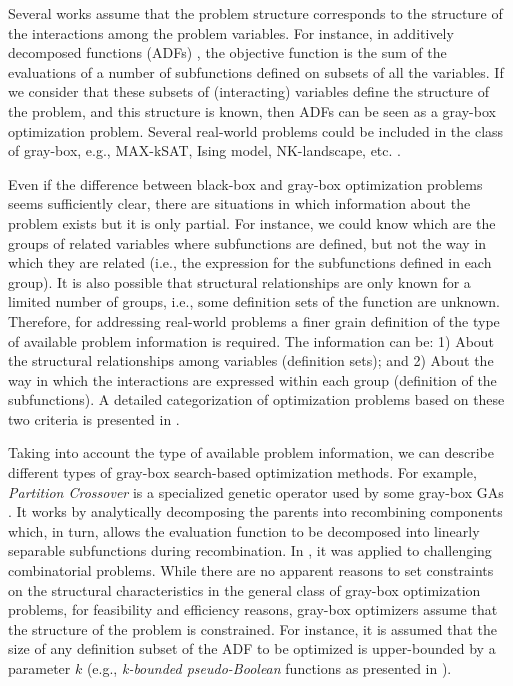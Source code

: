   Several works assume that the problem structure corresponds to the structure of the  interactions among the problem variables.  For instance, in additively decomposed functions (ADFs) \cite{Muhlenbein_et_al:1999},  the objective function is the  sum of the evaluations of a number of subfunctions defined on subsets of all the variables. If we consider that these subsets of (interacting) variables define the structure of the problem, and this structure is known, then ADFs can be seen as a gray-box optimization problem. Several real-world problems could be included in the class of  gray-box, e.g., MAX-kSAT, Ising model, NK-landscape, etc. \cite{Whitley:2015}.
  
   Even if the difference between black-box and gray-box optimization problems seems sufficiently clear,  there are situations in which information about the problem exists but it is only partial. For instance, we could know which are the groups of related variables where subfunctions are defined, but not the way in which they are related (i.e., the expression for the subfunctions defined in each group).  It is also possible that structural relationships are only known for a limited number of groups, i.e., some definition sets of the function are unknown.  Therefore, for addressing real-world problems a finer grain definition of the type of available problem information  is required.  The information can be: 1) About the structural relationships among variables (definition sets); and  2) About the way in which the interactions are expressed within each group (definition of the subfunctions).  A detailed categorization of optimization problems based on these two criteria is presented in \cite{Santana:2017a}. 

  Taking into account the type of available problem information,  we can describe different types of gray-box search-based optimization methods. For example, \emph{Partition Crossover} is a specialized genetic operator used by some gray-box GAs  \cite{Tinos_et_al:2015,Whitley:2015}. It works by analytically decomposing the  parents into recombining components which, in turn, allows the evaluation function to be decomposed into linearly separable subfunctions during recombination. In \cite{Tinos_et_al:2015}, it was applied to challenging combinatorial problems.   While there are no apparent reasons to set constraints on the structural characteristics  in the general class of gray-box optimization problems, for feasibility and efficiency reasons, gray-box optimizers assume that the  structure of the problem is constrained. For instance, it is assumed that the size of any definition subset of the ADF to be optimized is upper-bounded by a parameter $k$ (e.g.,  \emph{k-bounded pseudo-Boolean} functions as presented in \cite{Whitley:2015}).

